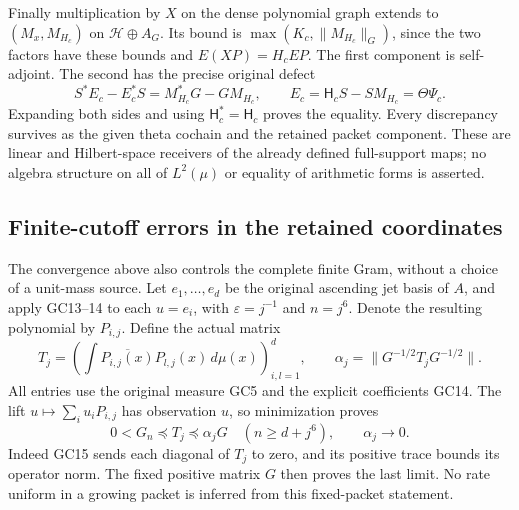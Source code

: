 Finally multiplication by $X$ on the dense polynomial graph
extends to $(M_x,M_{H_c})$ on $\mathcal H\oplus A_G$.
Its bound is $\max(K_c,\|M_{H_c}\|_G)$, since the two factors
have these bounds and $E(XP)=H_c EP$. The first component is
self-adjoint. The second has the precise original defect
\[
 S^*E_c-E_c^*S=M_{H_c}^*G-GM_{H_c},\qquad
 E_c=\mathsf H_cS-SM_{H_c}=\Theta\Psi_c.
 \tag{GC12}\label{gc:skew-defect}
\]
Expanding both sides and using $\mathsf H_c^*=\mathsf H_c$
proves the equality. Every discrepancy survives as the given
theta cochain and the retained packet component.
These are linear and Hilbert-space receivers of the already
defined full-support maps; no algebra structure on all of
$L^2(\mu)$ or equality of arithmetic forms is asserted.

\subsection{Finite-cutoff errors in the retained coordinates}
The convergence above also controls the complete finite Gram,
without a choice of a unit-mass source. Let $e_1,\ldots,e_d$ be
the original ascending jet basis of $A$, and apply GC13--14 to
each $u=e_i$, with $\varepsilon=j^{-1}$ and $n=j^6$. Denote the
resulting polynomial by $P_{i,j}$. Define the actual matrix
\[
 T_j=\left(\int\overline{P_{i,j}(x)}P_{l,j}(x)\,d\mu(x)
                    \right)_{i,l=1}^d,\qquad
 \alpha_j=\|G^{-1/2}T_jG^{-1/2}\|.
 \tag{GC16}\label{gc:finite-error}
\]
All entries use the original measure GC5 and the explicit
coefficients GC14. The lift $u\mapsto\sum_i u_iP_{i,j}$ has
observation $u$, so minimization proves
\[
 0<G_n\preceq T_j\preceq\alpha_jG
 \quad(n\ge d+j^6),\qquad \alpha_j\longrightarrow0.
 \tag{GC17}\label{gc:finite-domination}
\]
Indeed GC15 sends each diagonal of $T_j$ to zero, and its positive
trace bounds its operator norm. The fixed positive matrix $G$
then proves the last limit. No rate uniform in a growing packet
is inferred from this fixed-packet statement.

